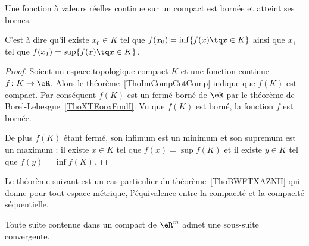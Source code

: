 \begin{theorem}\label{ThoMKKooAbHaro}
    Une fonction à valeurs réelles continue sur un compact est bornée et atteint ses bornes.

	C'est à dire qu'il existe $x_0\in K$ tel que $f(x_0)=\inf\{ f(x)\tq x\in K \}$ ainsi que $x_1$ tel que $f(x_1)=\sup\{ f(x)\tq x\in K \}$.
\end{theorem}

\begin{proof}
    Soient un espace topologique compact \( K\) et une fonction continue \( f\colon K\to \eR\). Alors le théorème~\ref{ThoImCompCotComp} indique que \( f(K)\) est compact. Par conséquent \( f(K)\) est un fermé borné de \( \eR\) par le théorème de Borel-Lebesgue~\ref{ThoXTEooxFmdI}. Vu que \( f(K)\) est borné, la fonction \( f\) est bornée.

    De plus \( f(K)\) étant fermé, son infimum est un minimum et son supremum est un maximum : il existe \( x\in K\) tel que \( f(x)=\sup f(K)\) et il existe \( y\in K\) tel que \( f(y)=\inf f(K)\).
\end{proof}

Le théorème suivant est un cas particulier du théorème~\ref{ThoBWFTXAZNH} qui donne pour tout espace métrique, l'équivalence entre la compacité et la compacité séquentielle.
\begin{theorem}		\label{ThoBolzanoWeierstrassRn}
	Toute suite contenue dans un compact de \( \eR^m\) admet une sous-suite convergente.
\end{theorem}

